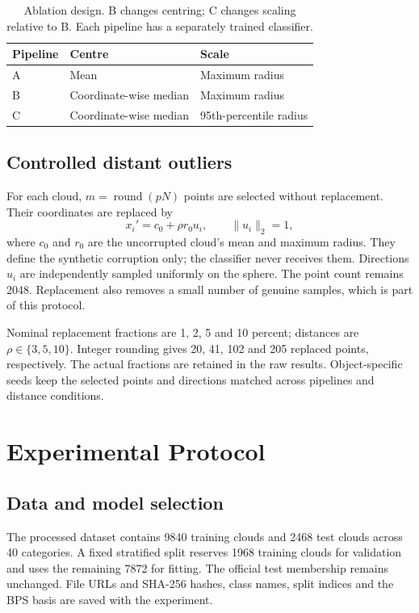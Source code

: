 \documentclass[11pt,a4paper]{article}
\begin{document}
\begin{table}[!ht]\centering
\begin{tabular}{lll}
\toprule Pipeline & Centre & Scale\\\midrule
A & Mean & Maximum radius\\
B & Coordinate-wise median & Maximum radius\\
C & Coordinate-wise median & 95th-percentile radius\\\bottomrule
\end{tabular}
\caption{Ablation design. B changes centring; C changes scaling relative to B. Each pipeline has a separately trained classifier.}
\end{table}

\subsection{Controlled distant outliers}
For each cloud, $m=\operatorname{round}(pN)$ points are selected without replacement. Their coordinates are replaced by
\begin{equation}
 x_i'=c_0+\rho r_0 u_i,\qquad \|u_i\|_2=1,
\end{equation}
where $c_0$ and $r_0$ are the uncorrupted cloud's mean and maximum radius. They define the synthetic corruption only; the classifier never receives them. Directions $u_i$ are independently sampled uniformly on the sphere. The point count remains 2048. Replacement also removes a small number of genuine samples, which is part of this protocol.

Nominal replacement fractions are 1, 2, 5 and 10 percent; distances are $\rho\in\{3,5,10\}$. Integer rounding gives 20, 41, 102 and 205 replaced points, respectively. The actual fractions are retained in the raw results. Object-specific seeds keep the selected points and directions matched across pipelines and distance conditions.
\clearpage

\section{Experimental Protocol}
\subsection{Data and model selection}
The processed dataset contains 9840 training clouds and 2468 test clouds across 40 categories. A fixed stratified split reserves 1968 training clouds for validation and uses the remaining 7872 for fitting. The official test membership remains unchanged. File URLs and SHA-256 hashes, class names, split indices and the BPS basis are saved with the experiment.
\end{document}
